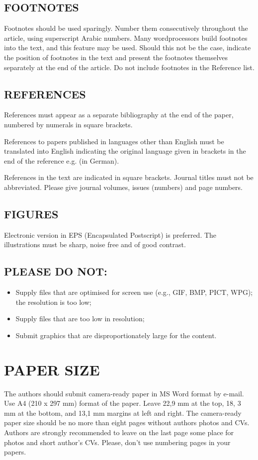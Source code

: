 \documentclass{ieeeijc}
\begin{document}
\subsection{FOOTNOTES}
Footnotes should be used sparingly. Number them consecutively throughout the article, using superscript Arabic numbers. Many wordprocessors build footnotes into the text, and this feature may be used. Should this not be the case, indicate the position of footnotes in the text and present the footnotes themselves separately at the end of the article. Do not include footnotes in the Reference list.

\subsection{REFERENCES}

References must appear as a separate bibliography at the end of the paper, numbered by numerals in square brackets.

References to papers published in languages other than English must be translated into English indicating the original language given in brackets in the end of the reference e.g. (in German).

References in the text are indicated in square brackets. Journal titles must not be abbreviated. Please give journal volumes, issues (numbers) and page numbers.

\subsection{FIGURES}
Electronic version in EPS (Encapsulated Postscript) is preferred. The illustrations must be sharp, noise free and of good contrast.

\subsection{PLEASE DO NOT:}
\begin{itemize}
  \item Supply files that are optimised for screen use (e.g., GIF, BMP, PICT, WPG); the resolution is too low;
  \item Supply files that are too low in resolution;
  \item Submit graphics that are disproportionately large for the content.
\end{itemize}

\section{PAPER SIZE}
The authors should submit camera-ready paper in MS Word format by e-mail. Use A4 (210 x 297 mm) format of the paper. Leave 22,9 mm at the top, 18, 3 mm at the bottom, and 13,1 mm margins at left and right. The camera-ready paper size should be no more than eight pages without authors photos and CVs. Authors are strongly recommended to leave on the last page some place for photos and short author’s CVs. Please, don’t use numbering pages in your papers.
\end{document}
